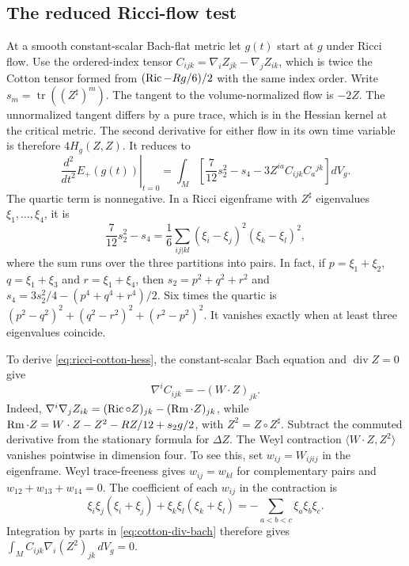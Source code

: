 \subsection{The reduced Ricci-flow test}\label{sec:cotton-variation}

At a smooth constant-scalar Bach-flat metric let \(g(t)\) start at
\(g\) under Ricci flow. Use the ordered-index tensor
\(C_{ijk}=\nabla_i Z_{jk}-\nabla_j Z_{ik}\), which is twice the
Cotton tensor formed from \((\operatorname{Ric}-Rg/6)/2\) with the same index order.
Write \(s_m=\operatorname{tr}((Z^\sharp)^m)\). The tangent to the
volume-normalized flow is \(-2Z\). The unnormalized tangent differs
by a pure trace, which is in the Hessian kernel at the critical
metric. The second derivative for either flow in its own time
variable is therefore \(4H_g(Z,Z)\). It reduces to
\begin{equation}\label{eq:ricci-cotton-hess}
 \left.\frac{d^2}{dt^2}E_+(g(t))\right|_{t=0}
 =\int_M\left[\frac7{12}s_2^2-s_4
      -3Z^{ia}C_{ijk}C_a{}^{jk}\right]dV_g .
\end{equation}
The quartic term is nonnegative. In a Ricci eigenframe with
\(Z^\sharp\) eigenvalues \(\xi_1,\ldots,\xi_4\), it is
\begin{equation}\label{eq:ricci-quartic}
 \frac7{12}s_2^2-s_4
 =\frac16\sum_{ij|kl}(\xi_i-\xi_j)^2(\xi_k-\xi_l)^2 ,
\end{equation}
where the sum runs over the three partitions into pairs. In fact,
if \(p=\xi_1+\xi_2\), \(q=\xi_1+\xi_3\) and \(r=\xi_1+\xi_4\),
then \(s_2=p^2+q^2+r^2\) and
\(s_4=3s_2^2/4-(p^4+q^4+r^4)/2\). Six times the quartic is
\((p^2-q^2)^2+(q^2-r^2)^2+(r^2-p^2)^2\). It vanishes exactly when
at least three eigenvalues coincide.

To derive \eqref{eq:ricci-cotton-hess}, the constant-scalar Bach
equation and \(\operatorname{div}Z=0\) give
\begin{equation}\label{eq:cotton-div-bach}
 \nabla^i C_{ijk}=-(W\cdot Z)_{jk} .
\end{equation}
Indeed, \(\nabla^i\nabla_j Z_{ik}=(\operatorname{Ric}\circ Z)_{jk}-(\operatorname{Rm}\cdot Z)_{jk}\),
while \(\operatorname{Rm}\cdot Z=W\cdot Z-Z^2-RZ/12+s_2g/2\), with \(Z^2=Z\circ Z^\sharp\).
Subtract the commuted derivative from the stationary formula for
\(\Delta Z\). The Weyl contraction \(\langle W\cdot Z,Z^2\rangle\)
vanishes pointwise in dimension four. To see this, set
\(w_{ij}=W_{ijij}\) in the eigenframe. Weyl trace-freeness gives
\(w_{ij}=w_{kl}\) for complementary pairs and
\(w_{12}+w_{13}+w_{14}=0\). The coefficient of each \(w_{ij}\) in
the contraction is
\[
 \xi_i\xi_j(\xi_i+\xi_j)+\xi_k\xi_l(\xi_k+\xi_l)
 =-\sum_{a<b<c}\xi_a\xi_b\xi_c .
\]
Integration by parts in \eqref{eq:cotton-div-bach} therefore gives
\(\int_M C_{ijk}\nabla_i(Z^2)_{jk}\,dV_g=0\).


